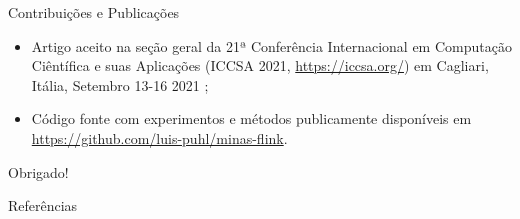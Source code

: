 \documentclass[aspectratio=1610,10pt]{beamer}
\begin{document}
\begin{frame}{Contribuições e Publicações}
  \begin{itemize}
    
    \item Artigo aceito na seção geral da 21ª Conferência Internacional em
    Computação Ciêntífica e suas Aplicações (ICCSA 2021,
    \url{https://iccsa.org/}) em Cagliari, Itália, Setembro 13-16 2021
    \cite{Puhl2021};
    
    
    \item Código fonte com experimentos e métodos publicamente disponíveis em
    \url{https://github.com/luis-puhl/minas-flink}.
  
  \end{itemize}
\end{frame}

{\begin{frame}[standout]
  Obrigado!
\end{frame}}

\begin{frame}[allowframebreaks]{Referências}
  
\end{frame}

\appendix
\end{document}
